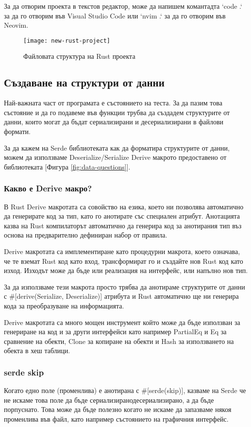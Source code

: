За да отворим проекта в текстов редактор, може да напишем комантадта `code .` за
да го отворим във Visual Studio Code или `nvim .` за да го отворим във Neovim.
 
\begin{figure}[!htb]
  \texttt{[image: new-rust-project]}
  \centering
  \caption{Файловата структура на Rust проекта}
  \label{fig:new-rust-project}
\end{figure}



\subsection{Създаване на структури от данни}
Най-важната част от програмата е състоянието на теста. За да пазим това състояние
и да го подавеме във функции трубва да създадем структурите от данни, които могат
да бъдат сериализирани и десериализирани в файлови формати.

За да кажем на Serde библиотеката как да форматира структурите от данни, можем
да използваме Deserialize/Serialize Derive макрото предоставено от библиотеката
[Фигура \ref{fig:data-questions}].

\subsubsection{Какво е Derive макро?}
В Rust Derive макротата са совойство на езика, което ни позволява автоматично
да генерирате код за тип, като го анотирате със специален атрибут. Анотацията
казва на Rust компилаторът автоматично да генерира код за анотирания тип въз
основа на предварително дефиниран набор от правила.

Derive макротата са имплементиране като процедурни макрота, което означава, че
те вземат Rust код като вход, трансформират го и създайте нов Rust код като
изход. Изходът може да бъде или реализация на интерфейс, или напълно нов
тип.

За да използваме тези макрота просто трябва да анотираме структурите от данни
с \#[derive(Serialize, Deserialize)] атрибута и Rust автоматично ще ни генерира
кода за преобразуване на информацията.

Derive макротата са много мощен инструмент който може да бъде използван за генериране
на код и за други интерфейси като например PartialEq и Eq за сравнение на обекти,
Clone за копиране на обекти и Hash за използването на обекта в хеш таблици.

\subsubsection{serde skip}
Когато едно поле (променлива) е анотирана с \#[serde(skip)], казваме на Serde че
не искаме това поле да бъде сериализирано\/десериализирано, а да бъде порпуснато.
Това може да бъде полезно когато не искаме да запазваме някоя променлива във файл,
като например състоянието на графичния интерфейс.

